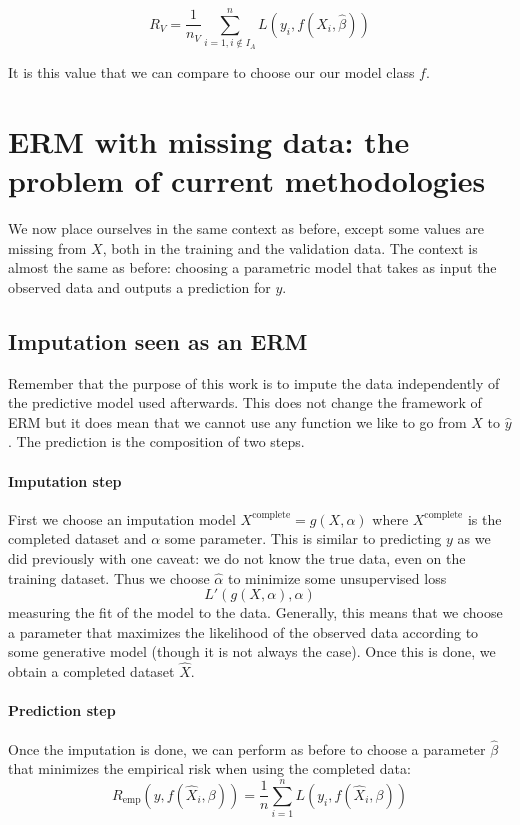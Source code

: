$$ R_{V} = \frac{1}{n_V} \sum\limits_{i=1, i \notin I_A}^n L(y_i, f(X_i, \hat{\beta}))$$

It is this value that we can compare to choose our our model class $f$.

	\section{ERM with missing data: the problem of current methodologies}
We now place ourselves in the same context as before, except some values are missing from $X$, both in the training and the validation data. The context is almost the same as before: choosing a parametric model that takes as input the observed data and outputs a prediction for $y$.
		\subsection{Imputation seen as an ERM}
Remember that the purpose of this work is to impute the data independently of the predictive model used afterwards. This does not change the framework of ERM but it does mean that we cannot use any function we like to go from $X$ to $\hat{y}$. The prediction is the composition of two steps.
			\paragraph{Imputation step}
First we choose an imputation model $X^{\text{complete}} = g(X, \alpha)$ where $X^{\text{complete}}$ is the completed dataset and $\alpha$ some parameter. This is similar to predicting $y$ as we did previously with one caveat: we do not know the true data, even on the training dataset. Thus we choose $\hat{\alpha}$ to minimize some unsupervised loss
$$L'(g(X, \alpha), \alpha)$$
 measuring the fit of the model to the data. Generally, this means that we choose a parameter that maximizes the likelihood of the observed data according to some generative model (though it is not always the case). Once this is done, we obtain a completed dataset $\hat{X}$.

			\paragraph{Prediction step}
Once the imputation is done, we can perform as before to choose a parameter $\hat{\beta}$ that minimizes the empirical risk when using the completed data:
	$$ R_{\text{emp}}(y, f(\hat{X}_i, \beta)) = \frac{1}{n} \sum\limits_{i=1}^n L(y_i, f(\hat{X}_i, \beta))$$
	
